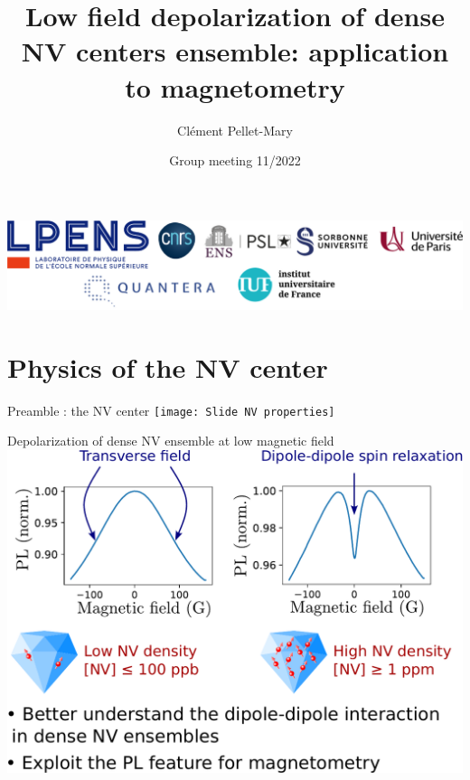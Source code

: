 \documentclass{beamer}
\title{Low field depolarization of dense NV centers ensemble: application to magnetometry}
\author{Clément Pellet-Mary}
\date{Group meeting 11/2022}
\begin{document}
\begin{frame}
\maketitle
\begin{center}
\includegraphics[width=\textwidth,height=0.3\textheight,keepaspectratio]{logos}
\end{center}
\end{frame}
\section{Physics of the NV center}
\begin{frame}{Preamble : the NV center}
\centering
\texttt{[image: Slide  NV properties]}
\end{frame}

%
%

\begin{frame}{Depolarization of dense NV ensemble at low magnetic field}
\centering
\includegraphics[width=\textwidth,height=0.9\textheight,keepaspectratio]{slide_presentation_sujet}
\end{frame}
\end{document}
